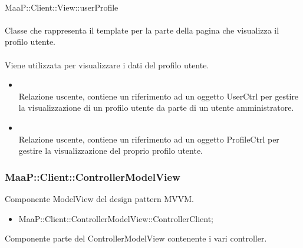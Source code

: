 \\
MaaP::Client::View::userProfile\\
\\
Classe che rappresenta il template per la parte della pagina che visualizza il profilo utente.\\
\\
Viene utilizzata per visualizzare i dati del profilo utente.\\
\begin{itemize}
\item{}\\
Relazione uscente, contiene un riferimento ad un oggetto UserCtrl per gestire la visualizzazione di un profilo utente da parte di un utente amministratore.
\item{}\\
Relazione uscente, contiene un riferimento ad un oggetto ProfileCtrl per gestire la visualizzazione del proprio profilo utente.
\end{itemize}


\subsubsection{MaaP::Client::ControllerModelView}
Componente ModelView del design pattern MVVM.
\begin{itemize}
\item MaaP::Client::ControllerModelView::ControllerClient;
\end{itemize}

Componente parte del ControllerModelView contenente i vari controller.

